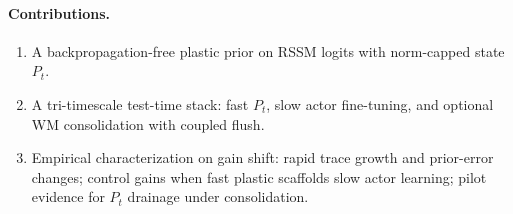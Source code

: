 \paragraph{Contributions.}
\begin{enumerate}[leftmargin=*, itemsep=2pt]
  \item A backpropagation-free plastic prior on RSSM logits with norm-capped state $P_t$.
  \item A tri-timescale test-time stack: fast $P_t$, slow actor fine-tuning, and optional WM consolidation with coupled flush.
  \item Empirical characterization on gain shift: rapid trace growth and prior-error changes; control gains when fast plastic scaffolds slow actor learning; pilot evidence for $P_t$ drainage under consolidation.
\end{enumerate}
